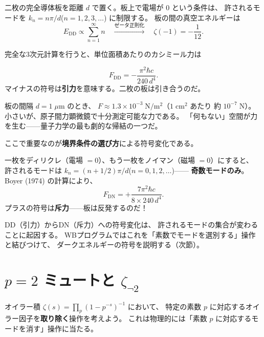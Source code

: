 \documentclass[11pt,a4paper]{article}
\theoremstyle{definition}
\begin{document}
\begin{dfnbox}
二枚の完全導体板を距離 $d$ で置く。板上で電場が $0$ という条件は、
許されるモードを $k_n = n\pi/d$\;($n = 1, 2, 3, \ldots$) に制限する。
板の間の真空エネルギーは
\[
  E_{\mathrm{DD}} \propto \sum_{n=1}^{\infty} n
  \quad\xrightarrow{\text{ゼータ正則化}}\quad
  \zeta(-1) = -\frac{1}{12}.
\]
\end{dfnbox}

完全な3次元計算を行うと、単位面積あたりのカシミール力は

\begin{keybox}
\[
  F_{\mathrm{DD}} = -\frac{\pi^2\hbar c}{240\, d^4}.
\]
マイナスの符号は\textbf{引力}を意味する。二枚の板は引き合うのだ。
\end{keybox}

\begin{hsbox}
板の間隔 $d = 1\;\mu\mathrm{m}$ のとき、
$F \approx 1.3 \times 10^{-3}\;\mathrm{N/m^2}$（$1\;\mathrm{cm^2}$ あたり
約 $10^{-7}\;\mathrm{N}$）。
小さいが、原子間力顕微鏡で十分測定可能な力である。
「何もない」空間が力を生む——量子力学の最も劇的な帰結の一つだ。
\end{hsbox}

ここで重要なのが\textbf{境界条件の選び方}による符号変化である。

\begin{keybox}
一枚をディリクレ（電場 $=0$）、もう一枚をノイマン（磁場 $=0$）にすると、
許されるモードは $k_n = (n+1/2)\pi/d$\;($n = 0, 1, 2, \ldots$)——
\textbf{奇数モードのみ}。Boyer (1974) の計算により、
\[
  F_{\mathrm{DN}} = +\frac{7\pi^2\hbar c}{8 \times 240\, d^4}.
\]
プラスの符号は\textbf{斥力}——板は反発するのだ！
\end{keybox}

DD（引力）からDN（斥力）への符号変化は、
許されるモードの集合が変わることに起因する。
WBプログラムではこれを「素数でモードを選別する」操作と結びつけて、
ダークエネルギーの符号を説明する（次節）。

\section{$p=2$ ミュートと $\zeta_{\neg 2}$}
\label{sec:4.3}

オイラー積 $\zeta(s) = \prod_p(1-p^{-s})^{-1}$ において、
特定の素数 $p$ に対応するオイラー因子を\textbf{取り除く}操作を考えよう。
これは物理的には「素数 $p$ に対応するモードを消す」操作に当たる。
\end{document}
